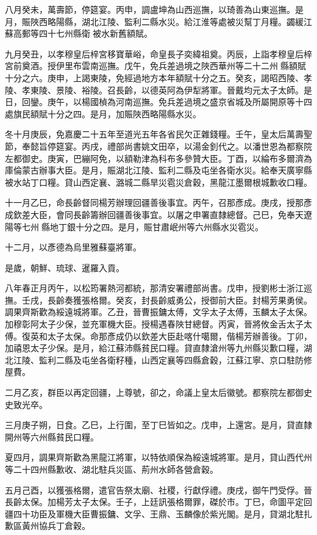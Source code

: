 \begin{pinyinscope}
八月癸未，萬壽節，停筵宴。丙申，調盧坤為山西巡撫，以琦善為山東巡撫。是月，賑陜西略陽縣，湖北江陵、監利二縣水災。給江淮等處被災幫丁月糧。蠲緩江蘇高郵等四十七州縣衛被水新舊額賦。

九月癸丑，以孝穆皇后梓宮移寶華峪，命皇長子奕緯祖奠。丙辰，上詣孝穆皇后梓宮前奠酒。授伊里布雲南巡撫。戊午，免兵差過境之陜西華州等二十二州縣額賦十分之六。庚申，上謁東陵，免經過地方本年額賦十分之五。癸亥，謁昭西陵、孝陵、孝東陵、景陵、裕陵。召長齡，以德英阿為伊犁將軍。晉戴均元太子太師。是日，回鑾。庚午，以楊國楨為河南巡撫。免兵差過境之盛京省城及所屬開原等十四處旗民額賦十分之四。是月，加賑陜西略陽縣水災。

冬十月庚辰，免嘉慶二十五年至道光五年各省民欠正雜錢糧。壬午，皇太后萬壽聖節，奉懿旨停筵宴。丙戌，禮部尚書姚文田卒，以湯金釗代之。以潘世恩為都察院左都御史。庚寅，巴繃阿免，以額勒津為科布多參贊大臣。丁酉，以綸布多爾濟為庫倫蒙古辦事大臣。是月，賑湖北江陵、監利二縣及屯坐各衛水災。給奉天廣寧縣被水站丁口糧。貸山西定襄、潞城二縣旱災雹災倉穀，黑龍江墨爾根城歉收口糧。

十一月乙巳，命長齡督同楊芳辦理回疆善後事宜。丙午，召那彥成。庚戌，授那彥成欽差大臣，會同長齡籌辦回疆善後事宜。以屠之申署直隸總督。己巳，免奉天遼陽等七州縣地丁銀十分之四。是月，賑甘肅岷州等六州縣水災雹災。

十二月，以彥德為烏里雅蘇臺將軍。

是歲，朝鮮、琉球、暹羅入貢。

八年春正月丙午，以松筠署熱河都統，那清安署禮部尚書。戊申，授劉彬士浙江巡撫。壬戌，長齡奏獲張格爾。癸亥，封長齡威勇公，授御前大臣。封楊芳果勇侯。調果齊斯歡為綏遠城將軍。乙丑，晉曹振鏞太傅，文孚太子太傅，玉麟太子太保。加穆彰阿太子少保，並充軍機大臣。授楊遇春陜甘總督。丙寅，晉將攸金舌太子太傅。復英和太子太保。命那彥成仍以欽差大臣赴喀什噶爾，偕楊芳辦善後。丁卯，加禧恩太子少保。是月，給江蘇沛縣貧民口糧。貸直隸滄州等九州縣災歉口糧，湖北江陵、監利二縣及屯坐各衛籽種，山西定襄等四縣倉穀，江蘇江寧、京口駐防修屋費。

二月乙亥，群臣以再定回疆，上尊號，卻之，命議上皇太后徽號。都察院左都御史史致光卒。

三月庚子朔，日食。乙巳，上行圍，至丁巳皆如之。戊申，上還宮。是月，貸直隸開州等六州縣貧民口糧。

夏四月，調果齊斯歡為黑龍江將軍，以特依順保為綏遠城將軍。是月，貸山西代州等二十四州縣歉收、湖北駐兵災區、荊州水師各營倉穀。

五月己酉，以獲張格爾，遣官告祭太廟、社稷，行獻俘禮。庚戌，御午門受俘。晉長齡太保。加楊芳太子太保。壬子，上廷訊張格爾罪，磔於市。丁巳，命圖平定回疆四十功臣及軍機大臣曹振鏞、文孚、王鼎、玉麟像於紫光閣。是月，貸湖北駐扎歉區黃州協兵丁倉穀。


\end{pinyinscope}
